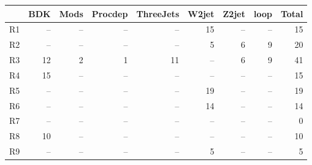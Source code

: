 \begin{tabular}{@{}lrrrrrrrr@{}}
  \toprule
  & BDK & Mods & Procdep & ThreeJets & W2jet & Z2jet & loop & Total \\
  \midrule
    R1 & -- & -- & -- & -- & 15 & -- & -- & 15 \\
    R2 & -- & -- & -- & -- & 5 & 6 & 9 & 20 \\
    R3 & 12 & 2 & 1 & 11 & -- & 6 & 9 & 41 \\
    R4 & 15 & -- & -- & -- & -- & -- & -- & 15 \\
    R5 & -- & -- & -- & -- & 19 & -- & -- & 19 \\
    R6 & -- & -- & -- & -- & 14 & -- & -- & 14 \\
    R7 & -- & -- & -- & -- & -- & -- & -- & 0 \\
    R8 & 10 & -- & -- & -- & -- & -- & -- & 10 \\
    R9 & -- & -- & -- & -- & 5 & -- & -- & 5 \\
  \bottomrule
\end{tabular}
